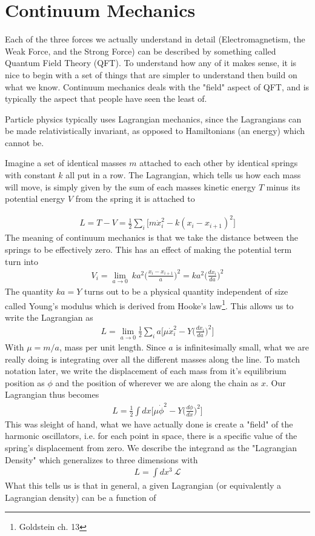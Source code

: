 \section{Continuum Mechanics}
Each of the three forces we actually understand in detail (Electromagnetism, the Weak Force, and the Strong Force) can be described by something called Quantum Field Theory (QFT). To understand how any of it makes sense, it is nice to begin with a set of things that are simpler to understand then build on what we know. Continuum mechanics deals with the "field" aspect of QFT, and is typically the aspect that people have seen the least of. 

Particle physics typically uses Lagrangian mechanics, since the Lagrangians can be made relativistically invariant, as opposed to  Hamiltonians (an energy) which cannot be.

Imagine a set of identical masses $m$ attached to each other by identical springs with constant $k$ all put in a row. The Lagrangian, which tells us how each mass will move, is simply given by the sum of each masses kinetic energy $T$ minus its potential energy $V$ from the spring it is attached to

\begin{align}
    L = T - V = \frac{1}{2}\sum_i \Big[m \dot{x}_i^2 - k(x_i - x_{i+1})^2\Big]
\end{align}
The meaning of continuum mechanics is that we take the distance between the springs to be effectively zero. This has an effect of making the potential term turn into
\begin{align}
    V_i =\lim_{a\to 0} ~k a^2 \Big(\frac{x_i - x_{i+1}}{a}\Big)^2 = ka^2 \Big(\frac{d x_i}{d a}\Big)^2
\end{align}
The quantity $ka = Y$ turns out to be a physical quantity independent of size called Young's modulus which is derived from Hooke's law\footnote{Goldstein ch. 13}. This allows us to write the Lagrangian as 
\begin{align}
    L = \lim_{a\to 0} \frac{1}{2}\sum_i a\Big[\mu \dot{x}_i^2 - Y\Big(\frac{d x_i}{d a}\Big)^2\Big]
\end{align}
With $\mu = m/a$, mass per unit length. Since $a$ is infinitesimally small, what we are really doing is integrating over all the different masses along the line. To match notation later, we write the displacement of each mass from it's equilibrium position as $\phi$ and the position of wherever we are along the chain as $x$. Our Lagrangian thus becomes
\begin{align}
    L = \frac{1}{2}\int dx \Big[\mu \dot{\phi}^2 - Y\Big(\frac{d\phi}{d x}\Big)^2\Big]
\end{align}
This was sleight of hand, what we have actually done is create a "field" of the harmonic oscillators, i.e. for each point in space, there is a specific value of the spring's displacement from zero. We describe the integrand as the "Lagrangian Density" which generalizes to three dimensions with
\begin{align}
    L = \int dx^3 ~\mathcal{L}
\end{align}
What this tells us is that in general, a given Lagrangian (or equivalently a Lagrangian density) can be a function of

